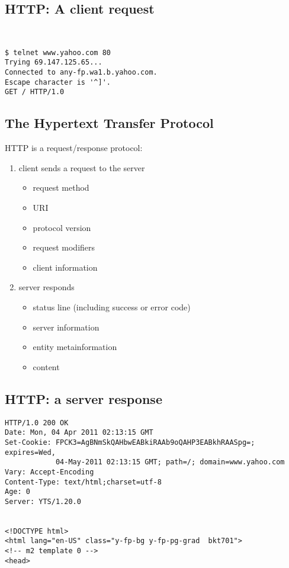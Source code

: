 \documentclass[xga]{xdvislides}
\begin{document}
\subsection{HTTP: A client request}
\vspace*{.5in}
\\
\Hugesize
\begin{center}
\begin{verbatim}
$ telnet www.yahoo.com 80
Trying 69.147.125.65...
Connected to any-fp.wa1.b.yahoo.com.
Escape character is '^]'.
GET / HTTP/1.0

\end{verbatim}
\end{center}
\Normalsize
\vspace*{\fill}


\subsection{The Hypertext Transfer Protocol}
HTTP is a request/response protocol:
\begin{enumerate}
	\item client sends a request to the server
		\begin{itemize}
			\item request method
			\item URI
			\item protocol version
			\item request modifiers
			\item client information
		\end{itemize}
	\item server responds
		\begin{itemize}
			\item status line (including success or error code)
			\item server information
			\item entity metainformation
			\item content
		\end{itemize}
\end{enumerate}

\subsection{HTTP: a server response}
\begin{verbatim}
HTTP/1.0 200 OK
Date: Mon, 04 Apr 2011 02:13:15 GMT
Set-Cookie: FPCK3=AgBNmSkQAHbwEABkiRAAb9oQAHP3EABkhRAASpg=; expires=Wed,
            04-May-2011 02:13:15 GMT; path=/; domain=www.yahoo.com
Vary: Accept-Encoding
Content-Type: text/html;charset=utf-8
Age: 0
Server: YTS/1.20.0


<!DOCTYPE html>
<html lang="en-US" class="y-fp-bg y-fp-pg-grad  bkt701">
<!-- m2 template 0 -->
<head>
\end{verbatim}
\end{document}
